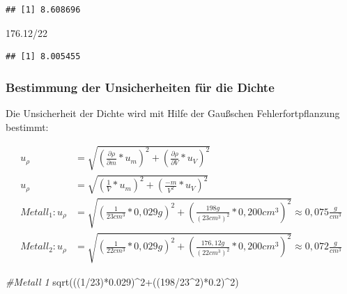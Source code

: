 \documentclass[class=article, crop=false]{standalone}
\newenvironment{Shaded}{\begin{snugshade}}{\end{snugshade}}
\newcommand{\CommentTok}[1]{\textcolor[rgb]{0.56,0.35,0.01}{\textit{#1}}}
\newcommand{\DecValTok}[1]{\textcolor[rgb]{0.00,0.00,0.81}{#1}}
\newcommand{\FloatTok}[1]{\textcolor[rgb]{0.00,0.00,0.81}{#1}}
\newcommand{\FunctionTok}[1]{\textcolor[rgb]{0.00,0.00,0.00}{#1}}
\newcommand{\NormalTok}[1]{#1}
\newcommand{\SpecialCharTok}[1]{\textcolor[rgb]{0.00,0.00,0.00}{#1}}
\begin{document}
\begin{verbatim}
## [1] 8.608696
\end{verbatim}

\begin{Shaded}
\begin{Highlighting}[]
\FloatTok{176.12}\SpecialCharTok{/}\DecValTok{22}
\end{Highlighting}
\end{Shaded}

\begin{verbatim}
## [1] 8.005455
\end{verbatim}

\hypertarget{bestimmung-der-unsicherheiten-fuxfcr-die-dichte}{%
\subsubsection{Bestimmung der Unsicherheiten für die
Dichte}\label{bestimmung-der-unsicherheiten-fuxfcr-die-dichte}}

Die Unsicherheit der Dichte wird mit Hilfe der Gaußschen
Fehlerfortpflanzung bestimmt:

\begin{equation*}
\begin{split}
u_{\rho}&=\sqrt{(\frac{\partial \rho}{\partial m}*u_m)^2+(\frac{\partial \rho}{\partial V}*u_V)^2}\\
u_{\rho}&=\sqrt{(\frac{1}{V}*u_m)^2+(\frac{-m}{V^2}*u_V)^2}\\
Metall_1: u_{\rho}&=\sqrt{(\frac{1}{23cm^3}*0,029g)^2+(\frac{198g}{(23cm^3)^2}*0,200cm^3)^2}\approx 0,075 \frac{g}{cm^3}\\
Metall_2: u_{\rho}&=\sqrt{(\frac{1}{22cm^3}*0,029g)^2+(\frac{176,12g}{(22cm^3)^2}*0,200cm^3)^2}\approx 0,072 \frac{g}{cm^3}
\end{split}
\end{equation*}

\begin{Shaded}
\begin{Highlighting}[]
\CommentTok{\#Metall 1}
\FunctionTok{sqrt}\NormalTok{(((}\DecValTok{1}\SpecialCharTok{/}\DecValTok{23}\NormalTok{)}\SpecialCharTok{*}\FloatTok{0.029}\NormalTok{)}\SpecialCharTok{\^{}}\DecValTok{2}\SpecialCharTok{+}\NormalTok{((}\DecValTok{198}\SpecialCharTok{/}\DecValTok{23}\SpecialCharTok{\^{}}\DecValTok{2}\NormalTok{)}\SpecialCharTok{*}\FloatTok{0.2}\NormalTok{)}\SpecialCharTok{\^{}}\DecValTok{2}\NormalTok{)}
\end{Highlighting}
\end{Shaded}
\end{document}
